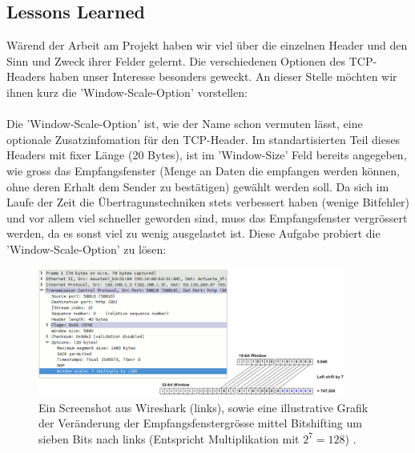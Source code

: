 \documentclass{article} %
\begin{document}
\newpage
\subsection{Lessons Learned}
Wärend der Arbeit am Projekt haben wir viel über die einzelnen Header und den Sinn und Zweck ihrer Felder gelernt. Die verschiedenen Optionen des TCP-Headers haben unser Interesse besonders geweckt. An dieser Stelle möchten wir ihnen kurz die 'Window-Scale-Option' vorstellen:\\
\\
Die 'Window-Scale-Option' ist, wie der Name schon vermuten lässt, eine optionale Zusatzinfomation für den TCP-Header. Im standartisierten Teil dieses Headers mit fixer Länge (20 Bytes), ist im 'Window-Size' Feld bereits angegeben, wie gross das Empfangsfenster (Menge an Daten die empfangen werden können, ohne deren Erhalt dem Sender zu bestätigen) gewählt werden soll. Da sich im Laufe der Zeit die Übertragunstechniken stets verbessert haben (wenige Bitfehler) und vor allem viel schneller geworden sind, muss das Empfangsfenster vergrössert werden, da es sonst viel zu wenig ausgelastet ist. Diese Aufgabe probiert die 'Window-Scale-Option' zu lösen:

\begin{figure}[!htb]
\begin{center}
\includegraphics[width=0.9\textwidth]{data/grafik8.png}
\captionsetup{singlelinecheck=off}
\caption[Titel]{
Ein Screenshot aus Wireshark (links), sowie eine illustrative Grafik der Veränderung der Empfangsfenstergrösse mittel Bitshifting um sieben Bits nach links (Entspricht Multiplikation mit $2^7=128$) \cite{packetlife}. 
}%
\label{Abb.54}
\end{center}
\end{figure}
\end{document}
